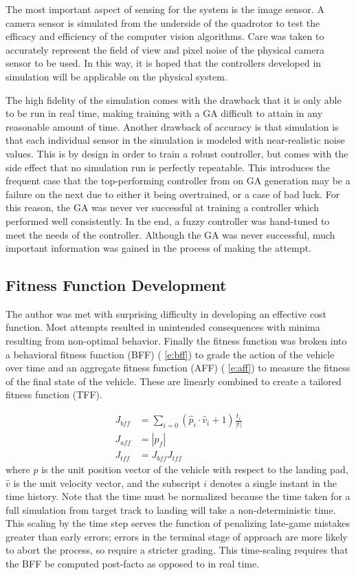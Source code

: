 The most important aspect of sensing for the system is the image sensor. A camera sensor is simulated from the
underside of the quadrotor to test the efficacy and efficiency of the computer vision algorithms. Care was
taken to accurately represent the field of view and pixel noise of the physical camera sensor to be used. In
this way, it is hoped that the controllers developed in simulation will be applicable on the physical system.

The high fidelity of the simulation comes with the drawback that it is only able to be run in real time,
making training with a GA difficult to attain in any reasonable amount of time. Another drawback of accuracy
is that simulation is that each individual sensor in the simulation is modeled with near-realistic noise
values. This is by design in order to train a robust controller, but comes with the side effect that no
simulation run is perfectly repeatable. This introduces the frequent case that the top-performing controller
from on GA generation may be a failure on the next due to either it being overtrained, or a case of bad luck.
For this reason, the GA was never ver successful at training a controller which performed well consistently.
In the end, a fuzzy controller was hand-tuned to meet the needs of the controller. Although the GA was never
successful, much important information was gained in the process of making the attempt.

\subsection{Fitness Function Development} The author was met with surprising difficulty in developing an
effective cost function. Most attempts resulted in unintended consequences with minima resulting from
non-optimal behavior. Finally the fitness function was broken into a behavioral fitness function (BFF) (
\cref{e:bff}) to grade the action of the vehicle over time and an aggregate fitness function (AFF) (
\cref{e:aff}) to measure the fitness of the final state of the vehicle. These are linearly combined to create
a tailored fitness function (TFF)\cite{divband2015effect}.

\begin{align}
J_{bff} &= \sum_{i=0}\left(\hat{p}_i\cdot\hat{v}_i + 1\right)\frac{t_i}{|t|} \label{e:bff}\\
    J_{aff} &= |p_f| \label{e:aff}\\
    J_{tff} &= J_{bff}J_{tff}\label{e:ff}
\end{align}
where $\hat{p}$ is the unit position vector of the vehicle with respect to the landing pad, $\hat{v}$ is the
unit velocity vector, and the subscript $i$ denotes a single instant in the time history. Note that the time
must be normalized because the time taken for a full simulation from target track to landing will take a
non-deterministic time. This scaling by the time step serves the function of penalizing late-game mistakes
greater than early errors; errors in the terminal stage of approach are more likely to abort the process, so
require a stricter grading. This time-scaling requires that the BFF be computed post-facto as opposed to in
real time.

